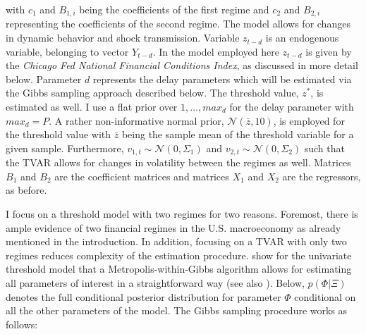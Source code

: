 \documentclass[12pt,letterpaper,fleqn]{article}           %
\begin{document}
with $c_1$ and $B_{1,i}$ being the coefficients of the first regime and $c_2$ and $B_{2,i}$ representing the coefficients of the second regime. The model allows for changes in dynamic behavior and shock transmission. Variable $z_{t-d}$ is an endogenous variable, belonging to vector $Y_{t-d}$. In the model employed here $z_{t-d}$ is given by the \textit{Chicago Fed National Financial Conditions Index}, as discussed in more detail below. Parameter $d$ represents the delay parameters which will be estimated via the Gibbs sampling approach described below. The threshold value, $z^*$, is estimated as well. I use a flat prior over $1,\ldots,max_d$ for the delay parameter with $max_d = P$. A rather non-informative normal prior, $\mathcal{N}(\bar{z}, 10)$, is employed for the threshold value with $\bar{z}$ being the sample mean of the threshold variable for a given sample. Furthermore, $v_{1,t} \sim \mathcal{N}(0, \Sigma_1)$ and $v_{2,t} \sim \mathcal{N}(0, \Sigma_2)$ such that the TVAR allows for changes in volatility between the regimes as well. Matrices $B_1$ and $B_2$ are the coefficient matrices and matrices $X_1$ and $X_2$ are the regressors, as before.  

I focus on a threshold model with two regimes for two reasons. Foremost, there is ample evidence of two financial regimes in the U.S. macroeconomy as already mentioned in the introduction. In addition, focusing on a TVAR with only two regimes reduces complexity of the estimation procedure. \textcite{chen95} show for the univariate threshold model that a Metropolis-within-Gibbs algorithm allows for estimating all parameters of interest in a straightforward way (see also \cite{alessandri17}). Below, $p(\Phi|\Xi)$ denotes the full conditional posterior distribution for parameter $\Phi$ conditional on all the other parameters of the model. The Gibbs sampling procedure works as follows:
\end{document}
